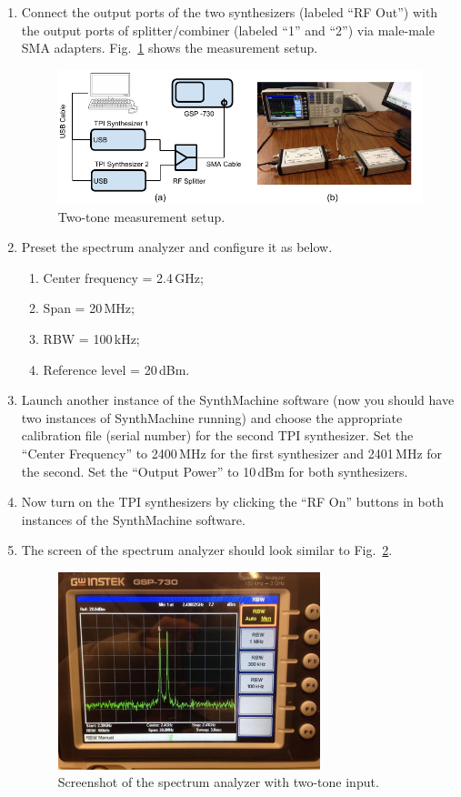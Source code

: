\documentclass[letterpaper, 11pt]{article}
\begin{document}
\begin{enumerate}
\begin{enumerate}
			\item Connect the output ports of the two synthesizers (labeled ``RF Out'') with the output ports of splitter/combiner (labeled ``1'' and ``2'') via male-male SMA adapters. Fig.~\ref{fig:setup-two-tone} shows the measurement setup. 
				\begin{figure}[h]
					\centering
					\includegraphics[width=5in]{setup-two-tone}
					\caption{Two-tone measurement setup.}
					\label{fig:setup-two-tone}
				\end{figure}			
			
			\item Preset the spectrum analyzer and configure it as below.
				\begin{enumerate}
					\item Center frequency = 2.4\,GHz;
					\item Span = 20\,MHz;
					\item RBW = 100\,kHz;
					\item Reference level = 20\,dBm.
				\end{enumerate}

			\item Launch another instance of the SynthMachine software (now you should have two instances of SynthMachine running) and choose the appropriate calibration file (serial number) for the second TPI synthesizer. Set the ``Center Frequency'' to 2400\,MHz for the first synthesizer and 2401\,MHz for the second. Set the ``Output Power'' to 10\,dBm for both synthesizers.
			
			\item Now turn on the TPI synthesizers by clicking the ``RF On'' buttons in both instances of the SynthMachine software. 
			
			\item The screen of the spectrum analyzer should look similar to Fig.~\ref{fig:sa-two-tone}. 
				\begin{figure}[h]
					\centering
					\includegraphics[width=3in]{sa-two-tone}
					\caption{Screenshot of the spectrum analyzer with two-tone input.}
					\label{fig:sa-two-tone}
				\end{figure}
			

\end{enumerate}
\end{enumerate}
\end{document}
